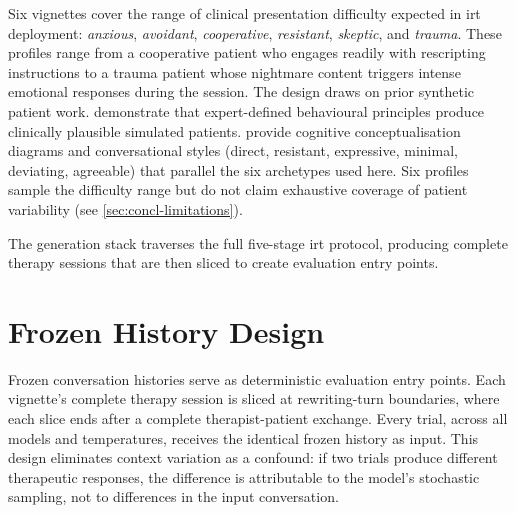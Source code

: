 Six vignettes cover the range of clinical presentation difficulty
expected in \gls{irt} deployment: \emph{anxious}, \emph{avoidant},
\emph{cooperative}, \emph{resistant}, \emph{skeptic}, and \emph{trauma}.
These profiles range from a cooperative patient who engages readily with
rescripting instructions to a trauma patient whose nightmare content
triggers intense emotional responses during the session. The design
draws on prior synthetic patient work. \textcite{Z22JYAMU} demonstrate that
expert-defined behavioural principles produce clinically plausible simulated
patients. \textcite{CQ94GEYA} provide cognitive conceptualisation diagrams
and conversational styles (direct, resistant, expressive, minimal, deviating,
agreeable) that parallel the six archetypes used here. Six profiles sample
the difficulty range but do not claim exhaustive coverage of patient
variability (see \autoref{sec:concl-limitations}).

The generation stack traverses the full five-stage \gls{irt} protocol,
producing complete therapy sessions that are then sliced to create
evaluation entry points.



\section{Frozen History Design}
\label{sec:meth-frozen}

Frozen conversation histories serve as deterministic evaluation entry
points. Each vignette's complete therapy session is sliced at
rewriting-turn boundaries, where each slice ends after a complete
therapist-patient exchange. Every trial, across all models and
temperatures, receives the identical frozen history as input. This design
eliminates context variation as a confound: if two trials produce different
therapeutic responses, the difference is attributable to the model's
stochastic sampling, not to differences in the input conversation.

